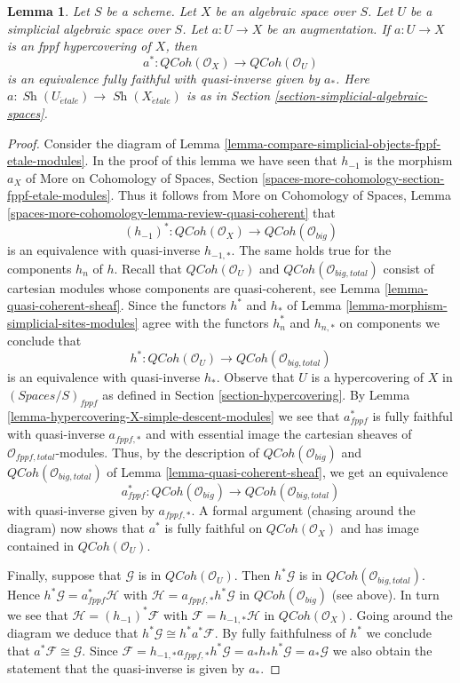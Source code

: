 \documentclass{stacks-project}
\theoremstyle{plain}
\newtheorem{lemma}[subsection]{Lemma}
\theoremstyle{definition}
\theoremstyle{remark}
\numberwithin{equation}{subsection}
\def\Sh{\mathop{\mathit{Sh}}\nolimits}
\def\etale{{\acute{e}tale}}
\def\QCoh{\mathit{QCoh}}
\begin{document}
\begin{lemma}
\label{lemma-descent-qcoh-for-fppf-hypercovering}
Let $S$ be a scheme. Let $X$ be an algebraic space over $S$.
Let $U$ be a simplicial algebraic space over $S$. Let $a : U \to X$
be an augmentation. If $a : U \to X$ is an fppf hypercovering of $X$,
then
$$
a^* : \QCoh(\mathcal{O}_X) \to \QCoh(\mathcal{O}_U)
$$
is an equivalence fully faithful with quasi-inverse given by $a_*$.
Here $a : \Sh(U_\etale) \to \Sh(X_\etale)$
is as in Section \ref{section-simplicial-algebraic-spaces}.
\end{lemma}

\begin{proof}
Consider the diagram of
Lemma \ref{lemma-compare-simplicial-objects-fppf-etale-modules}.
In the proof of this lemma we have seen that
$h_{-1}$ is the morphism $a_X$ of
More on Cohomology of Spaces, Section
\ref{spaces-more-cohomology-section-fppf-etale-modules}.
Thus it follows from
More on Cohomology of Spaces, Lemma
\ref{spaces-more-cohomology-lemma-review-quasi-coherent}
that
$$
(h_{-1})^* :
\QCoh(\mathcal{O}_X)
\longrightarrow
\QCoh(\mathcal{O}_{big})
$$
is an equivalence with quasi-inverse $h_{-1, *}$.
The same holds true for the components $h_n$ of $h$.
Recall that $\QCoh(\mathcal{O}_U)$ and $\QCoh(\mathcal{O}_{big, total})$
consist of cartesian modules whose components are quasi-coherent, see
Lemma \ref{lemma-quasi-coherent-sheaf}.
Since the functors $h^*$ and $h_*$ of
Lemma \ref{lemma-morphism-simplicial-sites-modules}
agree with the functors $h_n^*$ and $h_{n, *}$ on components
we conclude that
$$
h^* :
\QCoh(\mathcal{O}_U)
\longrightarrow 
\QCoh(\mathcal{O}_{big, total})
$$
is an equivalence with quasi-inverse $h_*$.
Observe that $U$ is a hypercovering of $X$ in $(\textit{Spaces}/S)_{fppf}$
as defined in Section \ref{section-hypercovering}.
By Lemma \ref{lemma-hypercovering-X-simple-descent-modules}
we see that $a_{fppf}^*$ is fully faithful with quasi-inverse
$a_{fppf, *}$ and with essential image the cartesian sheaves
of $\mathcal{O}_{fppf, total}$-modules.
Thus, by the description of $\QCoh(\mathcal{O}_{big})$ and
$\QCoh(\mathcal{O}_{big, total})$ of Lemma \ref{lemma-quasi-coherent-sheaf},
we get an equivalence
$$
a_{fppf}^* :
\QCoh(\mathcal{O}_{big})
\longrightarrow
\QCoh(\mathcal{O}_{big, total})
$$
with quasi-inverse given by $a_{fppf, *}$.
A formal argument (chasing around the diagram) now shows that
$a^*$ is fully faithful on $\QCoh(\mathcal{O}_X)$ and has
image contained in $\QCoh(\mathcal{O}_U)$.

\medskip\noindent
Finally, suppose that $\mathcal{G}$ is in $\QCoh(\mathcal{O}_U)$.
Then $h^*\mathcal{G}$ is in $\QCoh(\mathcal{O}_{big, total})$.
Hence $h^*\mathcal{G} = a_{fppf}^*\mathcal{H}$ with
$\mathcal{H} = a_{fppf, *}h^*\mathcal{G}$
in $\QCoh(\mathcal{O}_{big})$ (see above).
In turn we see that $\mathcal{H} = (h_{-1})^*\mathcal{F}$
with $\mathcal{F} = h_{-1, *}\mathcal{H}$ in $\QCoh(\mathcal{O}_X)$.
Going around the diagram we deduce that
$h^*\mathcal{G} \cong h^*a^*\mathcal{F}$.
By fully faithfulness of $h^*$ we conclude that
$a^*\mathcal{F} \cong \mathcal{G}$.
Since $\mathcal{F} = h_{-1, *}a_{fppf, *}h^*\mathcal{G} =
a_*h_*h^*\mathcal{G} = a_*\mathcal{G}$ we also obtain
the statement that the quasi-inverse is given by $a_*$.
\end{proof}
\end{document}
